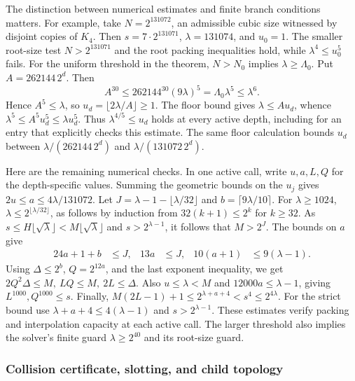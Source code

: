 \documentclass[
  11pt,
]{article}
\newcommand{\floor}[1]{\lfloor #1\rfloor}
\newcommand{\ceil}[1]{\lceil #1\rceil}
\begin{document}
The distinction between numerical estimates and finite branch
conditions matters. For example, take \(N=2^{131072}\), an admissible
cubic size witnessed by disjoint copies of \(K_4\). Then
\(s=7\cdot2^{131071}\), \(\lambda=131074\), and \(u_0=1\).
The smaller root-size test \(N>2^{131071}\) and the root packing
inequalities hold, while \(\lambda^4\le u_0^5\) fails.
For the uniform threshold in the theorem, \(N>N_0\) implies
\(\lambda\ge\Lambda_0\). Put \(A=262144\,2^d\). Then
\[
 A^{30}\le 262144^{30}(9\lambda)^5
           =\Lambda_0\lambda^5\le\lambda^6 .
\]
Hence \(A^5\le\lambda\), so \(u_d=\floor{2\lambda/A}\ge1\).
The floor bound gives \(\lambda\le A u_d\), whence
\(\lambda^5\le A^5 u_d^5\le\lambda u_d^5\).
Thus \(\lambda^{4/5}\le u_d\) holds at every active depth, including
for an entry that explicitly checks this estimate. The same floor
calculation bounds \(u_d\) between
\(\lambda/(262144\,2^d)\) and \(\lambda/(131072\,2^d)\).

Here are the remaining numerical checks. In one active call,
write \(u,a,L,Q\) for the depth-specific values. Summing the
geometric bounds on the \(u_j\) gives \(2u\le a\le4\lambda/131072\).
Let \(J=\lambda-1-\floor{\lambda/32}\) and
\(b=\ceil{9\lambda/10}\). For \(\lambda\ge1024\),
\(\lambda\le 2^{\floor{\lambda/32}}\), as follows by induction from
\(32(k+1)\le2^k\) for \(k\ge32\).
As \(s\le H\floor{\sqrt{\lambda}}<M\floor{\sqrt{\lambda}}\)
and \(s>2^{\lambda-1}\), it follows that \(M>2^J\).
The bounds on \(a\) give
\[
\begin{aligned}
 24a+1+b &\le J, & 13a &\le J, &
 10(a+1)&\le9(\lambda-1).
\end{aligned}
\]
Using \(\Delta\le2^b\), \(Q=2^{12a}\), and the last exponent
inequality, we get \(2Q^2\Delta\le M,\ LQ\le M,\ 2L\le\Delta\).
Also \(u\le\lambda<M\) and \(12000a\le\lambda-1\), giving \(L^{1000},Q^{1000}\le s\). Finally,
\(M(2L-1)+1\le2^{\lambda+a+4}<s^4\le2^{4\lambda}\).
For the strict bound use \(\lambda+a+4\le4(\lambda-1)\) and
\(s>2^{\lambda-1}\). These estimates verify packing and interpolation
capacity at each active call. The larger threshold also implies the
solver's finite guard \(\lambda\ge2^{40}\) and its root-size guard.

\subsubsection*{Collision certificate, slotting, and child topology}
\end{document}
